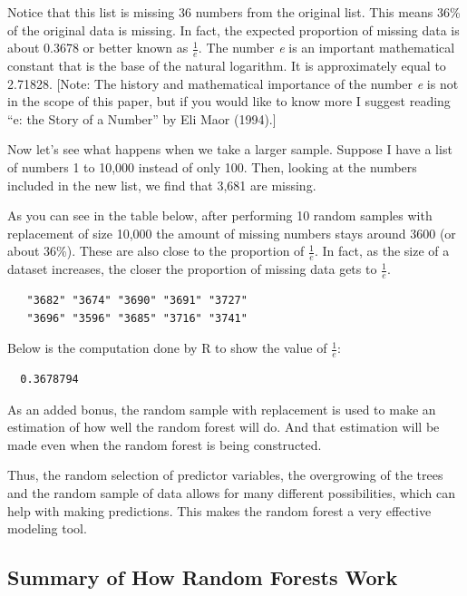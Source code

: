 \documentclass[12pt,twoside]{reedthesis}
\begin{document}
  Notice that this list is missing 36 numbers from the original list. This
  means 36\% of the original data is missing. In fact, the expected
  proportion of missing data is about 0.3678 or better known as
  \(\frac{1}{e}\). The number \emph{e} is an important mathematical
  constant that is the base of the natural logarithm. It is approximately
  equal to 2.71828. {[}Note: The history and mathematical importance of
  the number \emph{e} is not in the scope of this paper, but if you would
  like to know more I suggest reading ``e: the Story of a Number'' by Eli
  Maor (1994).{]}
  
  Now let's see what happens when we take a larger sample. Suppose I have
  a list of numbers 1 to 10,000 instead of only 100. Then, looking at the
  numbers included in the new list, we find that 3,681 are missing.
  
  As you can see in the table below, after performing 10 random samples
  with replacement of size 10,000 the amount of missing numbers stays
  around 3600 (or about 36\%). These are also close to the proportion of
  \(\frac{1}{e}\). In fact, as the size of a dataset increases, the closer
  the proportion of missing data gets to \(\frac{1}{e}\).
  
  \begin{verbatim}
   "3682" "3674" "3690" "3691" "3727"
   "3696" "3596" "3685" "3716" "3741"
  \end{verbatim}
  
  Below is the computation done by R to show the value of \(\frac{1}{e}\):
  
  \begin{verbatim}
  0.3678794
  \end{verbatim}
  
  As an added bonus, the random sample with replacement is used to make an
  estimation of how well the random forest will do. And that estimation
  will be made even when the random forest is being constructed.
  
  Thus, the random selection of predictor variables, the overgrowing of
  the trees and the random sample of data allows for many different
  possibilities, which can help with making predictions. This makes the
  random forest a very effective modeling tool.
  
  \subsection{Summary of How Random Forests
  Work}\label{summary-of-how-random-forests-work}
  
\end{document}
